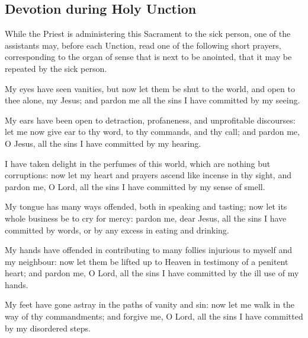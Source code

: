 \subsection{Devotion during Holy Unction}
\begin{rubric}
    While the Priest is administering this Sacrament to the sick person, one of the assistants may, before each Unction, read one of the following short prayers, corresponding to the organ of sense that is next to be anointed, that it may be repeated by the sick person.
\end{rubric}
My eyes have seen vanities, but now let them be shut to the world, and open to thee alone, my Jesus; and pardon me all the sins I have committed by my seeing.\par
My ears have been open to detraction, profaneness, and unprofitable discourses: let me now give ear to thy word, to thy commands, and thy call; and pardon me, O Jesus, all the sins I have committed by my hearing.\par
I have taken delight in the perfumes of this world, which are nothing but corruptions: now let my heart and prayers ascend like incense in thy sight, and pardon me, O Lord, all the sins I have committed by my sense of smell.\par
My tongue has many ways offended, both in speaking and tasting; now let its whole business be to cry for mercy: pardon me, dear Jesus, all the sins I have committed by words, or by any excess in eating and drinking.\par
My hands have offended in contributing to many follies injurious to myself and my neighbour: now let them be lifted up to Heaven in testimony of a penitent heart; and pardon me, O Lord, all the sins I have committed by the ill use of my hands.\par
My feet have gone astray in the paths of vanity and sin: now let me walk in the way of thy commandments; and forgive me, O Lord, all the sins I have committed by my disordered steps.
